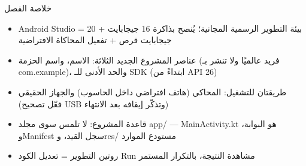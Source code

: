 \begin{tcbsummary}{خلاصة الفصل}
\begin{itemize}
  \item Android Studio = بيئة التطوير الرسمية المجانية؛ يُنصح بذاكرة 16 جيجابايت + 20 جيجابايت قرص + تفعيل المحاكاة الافتراضية
  \item عناصر المشروع الجديد الثلاثة: الاسم، واسم الحزمة (فريد عالميًا ولا تنشر بـ com.example)، والحد الأدنى للـ SDK (ابتداءً من API 26)
  \item طريقتان للتشغيل: المحاكي (هاتف افتراضي داخل الحاسوب) والجهاز الحقيقي (فعّل تصحيح USB وتذكّر إيقافه بعد الانتهاء)
  \item قاعدة المشروع: لا تلمس سوى مجلد app/ — MainActivity.kt هو البوابة، وManifest سجل القيد، وres/ مستودع الموارد
  \item روتين التطوير = تعديل الكود Run مشاهدة النتيجة، بالتكرار المستمر
\end{itemize}

\end{tcbsummary}
